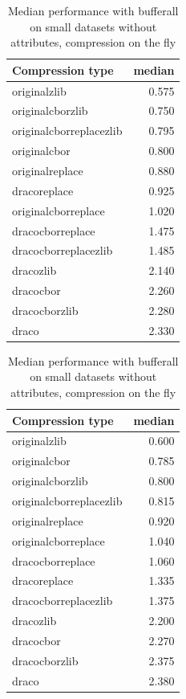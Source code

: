 \begin{table}[!h]
    \begin{minipage}{.5\linewidth}
      \caption{
Median performance with bufferall on small datasets, compression on the fly}
\centering

\begin{tabular}{|l|r|}
\hline
Compression type & median\\
\hline
originalzlib & 0.575\\
\hline
originalcborzlib & 0.750\\
\hline
originalcborreplacezlib & 0.795\\
\hline
originalcbor & 0.800\\
\hline
originalreplace & 0.880\\
\hline
dracoreplace & 0.925\\
\hline
originalcborreplace & 1.020\\
\hline
dracocborreplace & 1.475\\
\hline
dracocborreplacezlib & 1.485\\
\hline
dracozlib & 2.140\\
\hline
dracocbor & 2.260\\
\hline
dracocborzlib & 2.280\\
\hline
draco & 2.330\\
\hline
\end{tabular}
\end{minipage}%
    \begin{minipage}{.5\linewidth}
      \centering
        \caption{
Median performance with bufferall on small datasets without attributes, compression on the fly}

\begin{tabular}{|l|r|}
\hline
Compression type & median\\
\hline
originalzlib & 0.600\\
\hline
originalcbor & 0.785\\
\hline
originalcborzlib & 0.800\\
\hline
originalcborreplacezlib & 0.815\\
\hline
originalreplace & 0.920\\
\hline
originalcborreplace & 1.040\\
\hline
dracocborreplace & 1.060\\
\hline
dracoreplace & 1.335\\
\hline
dracocborreplacezlib & 1.375\\
\hline
dracozlib & 2.200\\
\hline
dracocbor & 2.270\\
\hline
dracocborzlib & 2.375\\
\hline
draco & 2.380\\
\hline
\end{tabular}
\end{minipage} 
\end{table}



